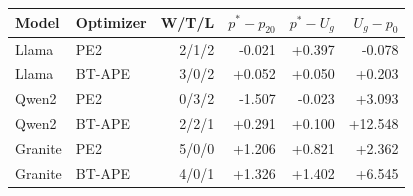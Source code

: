 \begin{tabular}{llrrrr}
\toprule
Model & Optimizer & W/T/L & $p^*-p_{20}$ & $p^*-U_g$ & $U_g-p_0$ \\
\midrule
Llama & PE2 & 2/1/2 & -0.021 & +0.397 & -0.078 \\
Llama & BT-APE & 3/0/2 & +0.052 & +0.050 & +0.203 \\
Qwen2 & PE2 & 0/3/2 & -1.507 & -0.023 & +3.093 \\
Qwen2 & BT-APE & 2/2/1 & +0.291 & +0.100 & +12.548 \\
Granite & PE2 & 5/0/0 & +1.206 & +0.821 & +2.362 \\
Granite & BT-APE & 4/0/1 & +1.326 & +1.402 & +6.545 \\
\bottomrule
\end{tabular}
